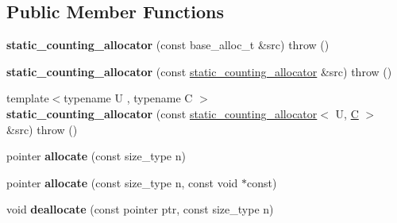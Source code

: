 \subsection*{Public Member Functions}
\begin{DoxyCompactItemize}
\item 
\hypertarget{classstatic__counting__allocator_a4e6249790e1828fcc01bea1fa68d4a8a}{}{\bfseries static\+\_\+counting\+\_\+allocator} (const base\+\_\+alloc\+\_\+t \&src)  throw ()\label{classstatic__counting__allocator_a4e6249790e1828fcc01bea1fa68d4a8a}

\item 
\hypertarget{classstatic__counting__allocator_ac0e564c4dcdc1dd0bbba8989addcdb3c}{}{\bfseries static\+\_\+counting\+\_\+allocator} (const \hyperlink{classstatic__counting__allocator}{static\+\_\+counting\+\_\+allocator} \&src)  throw ()\label{classstatic__counting__allocator_ac0e564c4dcdc1dd0bbba8989addcdb3c}

\item 
\hypertarget{classstatic__counting__allocator_aa2bbc0e9f0402fcef4b908bcfeb67c37}{}{\footnotesize template$<$typename U , typename C $>$ }\\{\bfseries static\+\_\+counting\+\_\+allocator} (const \hyperlink{classstatic__counting__allocator}{static\+\_\+counting\+\_\+allocator}$<$ U, \hyperlink{classC}{C} $>$ \&src)  throw ()\label{classstatic__counting__allocator_aa2bbc0e9f0402fcef4b908bcfeb67c37}

\item 
\hypertarget{classstatic__counting__allocator_a3a214a5f0b15d7c69f9d0eaf55a5ebd7}{}pointer {\bfseries allocate} (const size\+\_\+type n)\label{classstatic__counting__allocator_a3a214a5f0b15d7c69f9d0eaf55a5ebd7}

\item 
\hypertarget{classstatic__counting__allocator_a4e1412e490e69c5e1f506566ba9f69d6}{}pointer {\bfseries allocate} (const size\+\_\+type n, const void $\ast$const)\label{classstatic__counting__allocator_a4e1412e490e69c5e1f506566ba9f69d6}

\item 
\hypertarget{classstatic__counting__allocator_ab1b2180007d3b39c2f1409b6e931d235}{}void {\bfseries deallocate} (const pointer ptr, const size\+\_\+type n)\label{classstatic__counting__allocator_ab1b2180007d3b39c2f1409b6e931d235}

\end{DoxyCompactItemize}
